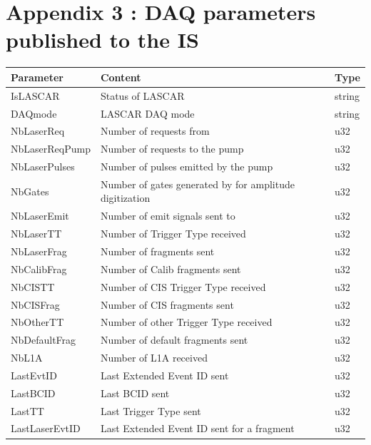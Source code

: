 \vspace*{5cm}
\newpage

\part*{Appendix 3 : DAQ parameters published to the IS}
\label{app:c}

\begin{table}[htbp]
  \begin{center}
{\footnotesize
    \begin{tabular}{lll}
      \hline\hline
      Parameter & Content & Type \\
      \hline
      IsLASCAR & Status of LASCAR & string \\
      DAQmode & LASCAR DAQ mode & string \\
      NbLaserReq & Number of \las{} requests from \shaft{} & u32 \\
      NbLaserReqPump & Number of \las{} requests to the pump & u32 \\
      NbLaserPulses & Number of \las{} pulses emitted by the pump & u32 \\
      NbGates & Number of gates generated by \lascar{} for amplitude digitization & u32 \\
      NbLaserEmit & Number of \las{} emit signals sent to \shaft{} & u32 \\
      NbLaserTT & Number of \las{} Trigger Type received & u32 \\
      NbLaserFrag & Number of \las{} fragments sent & u32 \\
      NbCalibFrag & Number of Calib fragments sent & u32 \\
      NbCISTT & Number of CIS Trigger Type received & u32 \\
      NbCISFrag & Number of CIS fragments sent & u32 \\
      NbOtherTT & Number of other Trigger Type received & u32 \\
      NbDefaultFrag & Number of default fragments sent & u32 \\
      NbL1A & Number of L1A received & u32 \\
      LastEvtID & Last Extended Event ID sent & u32 \\
      LastBCID & Last BCID sent & u32 \\
      LastTT & Last Trigger Type sent & u32 \\
      LastLaserEvtID & Last Extended Event ID sent for a \las{} fragment & u32 \\

\end{tabular}}
\end{center}
\end{table}
